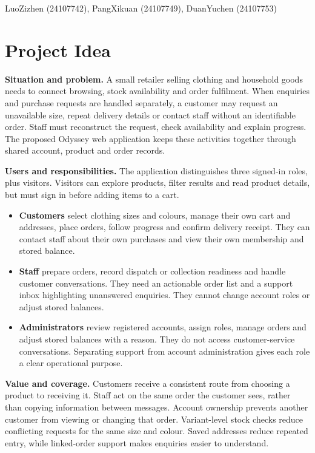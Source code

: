 

\newcommand{\EUR}{\texteuro}
\usepackage{textcomp}


{LuoZizhen (24107742), PangXikuan (24107749), DuanYuchen (24107753)}

\section{Project Idea}
\textbf{Situation and problem.} A small retailer selling clothing and household goods needs to connect browsing, stock availability and order fulfilment. When enquiries and purchase requests are handled separately, a customer may request an unavailable size, repeat delivery details or contact staff without an identifiable order. Staff must reconstruct the request, check availability and explain progress. The proposed Odyssey web application keeps these activities together through shared account, product and order records.

\textbf{Users and responsibilities.} The application distinguishes three signed-in roles, plus visitors. Visitors can explore products, filter results and read product details, but must sign in before adding items to a cart.
\begin{itemize}
\item \textbf{Customers} select clothing sizes and colours, manage their own cart and addresses, place orders, follow progress and confirm delivery receipt. They can contact staff about their own purchases and view their own membership and stored balance.
\item \textbf{Staff} prepare orders, record dispatch or collection readiness and handle customer conversations. They need an actionable order list and a support inbox highlighting unanswered enquiries. They cannot change account roles or adjust stored balances.
\item \textbf{Administrators} review registered accounts, assign roles, manage orders and adjust stored balances with a reason. They do not access customer-service conversations. Separating support from account administration gives each role a clear operational purpose.
\end{itemize}

\textbf{Value and coverage.} Customers receive a consistent route from choosing a product to receiving it. Staff act on the same order the customer sees, rather than copying information between messages. Account ownership prevents another customer from viewing or changing that order. Variant-level stock checks reduce conflicting requests for the same size and colour. Saved addresses reduce repeated entry, while linked-order support makes enquiries easier to understand.

